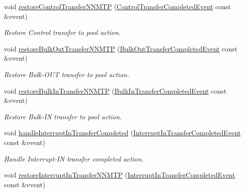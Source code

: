 \begin{DoxyCompactItemize}
void \hyperlink{structmdt_usbtmc_transfer_handler_state_machine_1_1_state_machine___abd55e373a05224ba348754f5826e1c7f}{restore\-Control\-Transfer\-N\-N\-M\-T\-P} (\hyperlink{structmdt_usbtmc_transfer_handler_state_machine_1_1_control_transfer_completed_event}{Control\-Transfer\-Completed\-Event} const \&event)
\begin{DoxyCompactList}\small\item\em Restore Control transfer to pool action. \end{DoxyCompactList}\item 
void \hyperlink{structmdt_usbtmc_transfer_handler_state_machine_1_1_state_machine___af1830c83d8c8d57957d122c4ef8969f9}{restore\-Bulk\-Out\-Transfer\-N\-N\-M\-T\-P} (\hyperlink{structmdt_usbtmc_transfer_handler_state_machine_1_1_bulk_out_transfer_completed_event}{Bulk\-Out\-Transfer\-Completed\-Event} const \&event)
\begin{DoxyCompactList}\small\item\em Restore Bulk-\/\-O\-U\-T transfer to pool action. \end{DoxyCompactList}\item 
void \hyperlink{structmdt_usbtmc_transfer_handler_state_machine_1_1_state_machine___acae833403385208fd22a87adc26dd1ff}{restore\-Bulk\-In\-Transfer\-N\-N\-M\-T\-P} (\hyperlink{structmdt_usbtmc_transfer_handler_state_machine_1_1_bulk_in_transfer_completed_event}{Bulk\-In\-Transfer\-Completed\-Event} const \&event)
\begin{DoxyCompactList}\small\item\em Restore Bulk-\/\-I\-N transfer to pool action. \end{DoxyCompactList}\item 
void \hyperlink{structmdt_usbtmc_transfer_handler_state_machine_1_1_state_machine___aa77fe5710afe7a2f51a7a44bc98fc095}{handle\-Interrupt\-In\-Transfer\-Completed} (\hyperlink{structmdt_usbtmc_transfer_handler_state_machine_1_1_interrupt_in_transfer_completed_event}{Interrupt\-In\-Transfer\-Completed\-Event} const \&event)
\begin{DoxyCompactList}\small\item\em Handle Interrupt-\/\-I\-N transfer completed action. \end{DoxyCompactList}\item 
void \hyperlink{structmdt_usbtmc_transfer_handler_state_machine_1_1_state_machine___a4dd693409fdfb7f2205cb5bb69683f84}{restore\-Interrupt\-In\-Transfer\-N\-N\-M\-T\-P} (\hyperlink{structmdt_usbtmc_transfer_handler_state_machine_1_1_interrupt_in_transfer_completed_event}{Interrupt\-In\-Transfer\-Completed\-Event} const \&event)

\end{DoxyCompactItemize}
